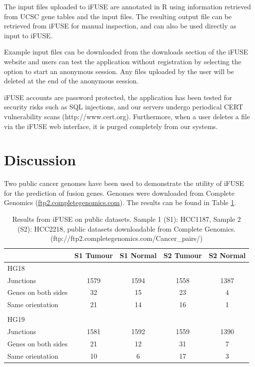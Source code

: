 The input files uploaded to iFUSE are annotated in R using information retrieved from UCSC gene tables and the input files. The resulting output file can be retrieved from iFUSE for manual inspection, and can also be used directly as input to iFUSE.

Example input files can be downloaded from the downloads section of the iFUSE website and users can test the application without registration by selecting the option to start an anonymous session. Any files uploaded by the user will be deleted at the end of the anonymous session.

iFUSE accounts are password protected, the application has been tested for security risks such as SQL injections, and our servers undergo periodical CERT vulnerability scans (http://www.cert.org). Furthermore, when a user deletes a file via the iFUSE web interface, it is purged completely from our systems.

\section*{Discussion}


Two public cancer genomes have been used to demonstrate the utility of iFUSE for the prediction of fusion genes. Genomes were downloaded from Complete Genomics (\href{ftp2.completegenomics.com}{ftp2.completegenomics.com}). The results can be found in Table \ref{tab:results}.


\begin{table}[!t]
    \begin{tabular}{lcccc}
        \toprule
                              & S1 Tumour  & S1 Normal  & S2 Tumour   & S2 Normal \\
        \midrule
        HG18                  &            &            &             &         \\
        Junctions             & 1579       & 1594       & 1558        & 1387    \\
        Genes on both sides   & 32         & 15         & 23          & 4       \\
        Same orientation      & 21         & 14         & 16          & 1       \\
                              &            &            &             &         \\
        HG19                  &            &            &             &         \\
        Junctions             & 1581       & 1592       & 1559        & 1390    \\
        Genes on both sides   & 21         & 12         & 31          & 7       \\
        Same orientation      & 10         & 6          & 17          & 3       \\
        \toprule
    \end{tabular}
    \caption{Results from iFUSE on public datasets. Sample 1 (S1): HCC1187, Sample 2 (S2): HCC2218, public datasets downloadable from Complete Genomics. (ftp://ftp2.completegenomics.com/Cancer\_pairs/)
    }
    \label{tab:results}
\end{table}

